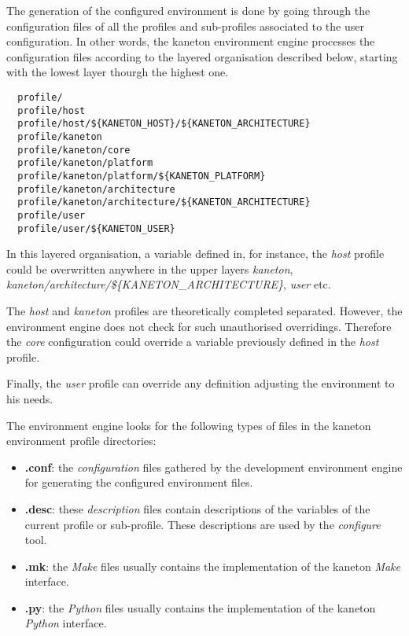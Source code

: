 The generation of the configured environment is done by going through
the configuration files of all the profiles and sub-profiles associated
to the user configuration. In other words, the kaneton environment engine
processes the configuration files according to the layered organisation
described below, starting with the lowest layer thourgh the highest one.

\begin{verbatim}
  profile/
  profile/host
  profile/host/${KANETON_HOST}/${KANETON_ARCHITECTURE}
  profile/kaneton
  profile/kaneton/core
  profile/kaneton/platform
  profile/kaneton/platform/${KANETON_PLATFORM}
  profile/kaneton/architecture
  profile/kaneton/architecture/${KANETON_ARCHITECTURE}
  profile/user
  profile/user/${KANETON_USER}         
\end{verbatim}

In this layered organisation, a variable defined in, for instance, the
\textit{host} profile could be overwritten anywhere in the upper layers
\textit{kaneton}, \textit{kaneton/architecture/\$\{KANETON\_ARCHITECTURE\}},
\textit{user} etc.

The \textit{host} and \textit{kaneton} profiles are theoretically completed
separated. However, the environment engine does not check for such
unauthorised overridings. Therefore the \textit{core} configuration could
override a variable previously defined in the \textit{host} profile.

Finally, the \textit{user} profile can override any definition adjusting the
environment to his needs.

The environment engine looks for the following types of files in the
kaneton environment profile directories:

\begin{itemize}
  \item
    \textbf{.conf}: the \textit{configuration} files gathered by the
    development environment engine for generating the configured environment
    files.
  \item
    \textbf{.desc}: these \textit{description} files contain descriptions of
    the variables of the current profile or sub-profile. These descriptions
    are used by the \textit{configure} tool.
  \item
    \textbf{.mk}: the \textit{Make} files usually contains the implementation
    of the kaneton \textit{Make} interface.
  \item
    \textbf{.py}: the \textit{Python} files usually contains the
    implementation of the kaneton \textit{Python} interface.
\end{itemize}


